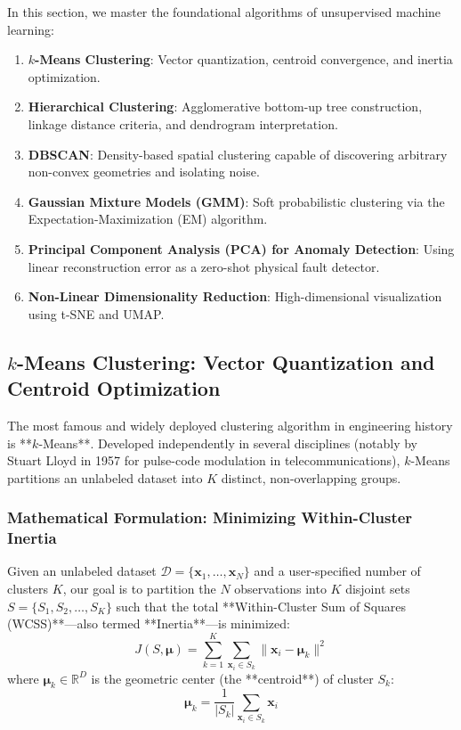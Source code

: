 In this section, we master the foundational algorithms of unsupervised machine learning:
\begin{enumerate}
    \item \textbf{$k$-Means Clustering}: Vector quantization, centroid convergence, and inertia optimization.
    \item \textbf{Hierarchical Clustering}: Agglomerative bottom-up tree construction, linkage distance criteria, and dendrogram interpretation.
    \item \textbf{DBSCAN}: Density-based spatial clustering capable of discovering arbitrary non-convex geometries and isolating noise.
    \item \textbf{Gaussian Mixture Models (GMM)}: Soft probabilistic clustering via the Expectation-Maximization (EM) algorithm.
    \item \textbf{Principal Component Analysis (PCA) for Anomaly Detection}: Using linear reconstruction error as a zero-shot physical fault detector.
    \item \textbf{Non-Linear Dimensionality Reduction}: High-dimensional visualization using t-SNE and UMAP.
\end{enumerate}

\subsection{$k$-Means Clustering: Vector Quantization and Centroid Optimization}\label{subsec:kmeans}

The most famous and widely deployed clustering algorithm in engineering history is **$k$-Means**. Developed independently in several disciplines (notably by Stuart Lloyd in 1957 for pulse-code modulation in telecommunications), $k$-Means partitions an unlabeled dataset into $K$ distinct, non-overlapping groups.

\subsubsection{Mathematical Formulation: Minimizing Within-Cluster Inertia}
Given an unlabeled dataset $\mathcal{D} = \{\mathbf{x}_1, \dots, \mathbf{x}_N\}$ and a user-specified number of clusters $K$, our goal is to partition the $N$ observations into $K$ disjoint sets $S = \{S_1, S_2, \dots, S_K\}$ such that the total **Within-Cluster Sum of Squares (WCSS)**---also termed **Inertia**---is minimized:
\begin{equation}
J(S, \boldsymbol{\mu}) = \sum_{k=1}^{K} \sum_{\mathbf{x}_i \in S_k} \|\mathbf{x}_i - \boldsymbol{\mu}_k\|^2\label{eq:kmeans_inertia}
\end{equation}
where $\boldsymbol{\mu}_k \in \mathbb{R}^D$ is the geometric center (the **centroid**) of cluster $S_k$:
\begin{equation}
\boldsymbol{\mu}_k = \frac{1}{|S_k|} \sum_{\mathbf{x}_i \in S_k} \mathbf{x}_i\label{eq:kmeans_centroid_def}
\end{equation}

